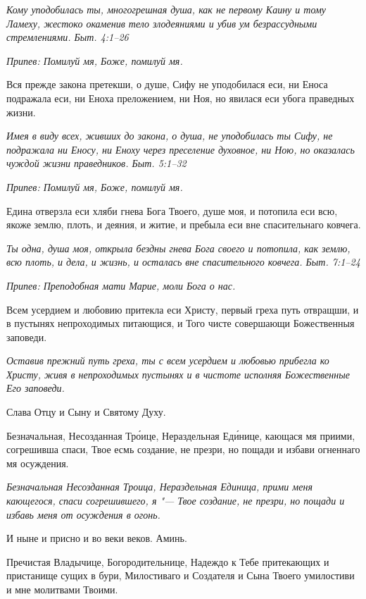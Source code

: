 \itshape Кому уподобилась ты, многогрешная душа, как не первому Каину и тому Ламеху, жестоко окаменив тело злодеяниями и убив ум безрассудными стремлениями. Быт. 4:1–26\normalfont{}


\itshape Припев:\normalfont{} Помилуй мя, Боже, помилуй мя.


Вся прежде закона претекши, о душе, Сифу не уподобилася еси, ни Еноса подражала еси, ни Еноха преложением, ни Ноя, но явилася еси убога праведных жизни.


\itshape Имея в виду всех, живших до закона, о душа, не уподобилась ты Сифу, не подражала ни Еносу, ни Еноху через преселение духовное, ни Ною, но оказалась чуждой жизни праведников. Быт. 5:1–32\normalfont{}


\itshape Припев:\normalfont{} Помилуй мя, Боже, помилуй мя.


Едина отверзла еси хляби гнева Бога Твоего, душе моя, и потопила еси всю, якоже землю, плоть, и деяния, и житие, и пребыла еси вне спасительнаго ковчега.


\itshape Ты одна, душа моя, открыла бездны гнева Бога своего и потопила, как землю, всю плоть, и дела, и жизнь, и осталась вне спасительного ковчега. Быт. 7:1–24\normalfont{}


\itshape Припев:\normalfont{} Преподобная мати Марие, моли Бога о нас.


Всем усердием и любовию притекла еси Христу, первый греха путь отвращши, и в пустынях непроходимых питающися, и Того чисте совершающи Божественныя заповеди.


\itshape Оставив прежний путь греха, ты с всем усердием и любовью прибегла ко Христу, живя в непроходимых пустынях и в чистоте исполняя Божественные Его заповеди.\normalfont{}


Слава Отцу и Сыну и Святому Духу.


Безначальная, Несозданная Тро́ице, Нераздельная Еди́нице, кающася мя приими, согрешивша спаси, Твое есмь создание, не презри, но пощади и избави огненнаго мя осуждения.


\itshape Безначальная Несозданная Троица, Нераздельная Единица, прими меня кающегося, спаси согрешившего, я "--- Твое создание, не презри, но пощади и избавь меня от осуждения в огонь.\normalfont{}


И ныне и присно и во веки веков. Аминь.


Пречистая Владычице, Богородительнице, Надеждо к Тебе притекающих и пристанище сущих в бури, Милостиваго и Создателя и Сына Твоего умилостиви и мне молитвами Твоими.


